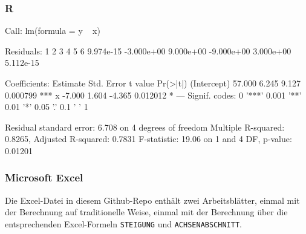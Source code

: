 \documentclass[ngerman, 12pt,parskip=half]{scrartcl}
\begin{document}
\subsubsection{R}




\begin{ausgabe}
Call:
lm(formula = y ~ x)

Residuals:
         1          2          3          4          5          6 
 9.974e-15 -3.000e+00  9.000e+00 -9.000e+00  3.000e+00  5.112e-15 

Coefficients:
            Estimate Std. Error t value Pr(>|t|)    
(Intercept)   57.000      6.245   9.127 0.000799 ***
x             -7.000      1.604  -4.365 0.012012 *  
---
Signif. codes:  0 '***' 0.001 '**' 0.01 '*' 0.05 '.' 0.1 ' ' 1

Residual standard error: 6.708 on 4 degrees of freedom
Multiple R-squared:  0.8265,	Adjusted R-squared:  0.7831 
F-statistic: 19.06 on 1 and 4 DF,  p-value: 0.01201
\end{ausgabe}

\subsubsection{Microsoft Excel}

Die Excel-Datei in diesem Github-Repo enthält zwei Arbeitsblätter, einmal mit der Berechnung auf traditionelle Weise, einmal mit der Berechnung über die entsprechenden Excel-Formeln \texttt{STEIGUNG} und \texttt{ACHSENABSCHNITT}.



\begin{center}
\label{fig:excelm}
\end{center}
\end{document}
